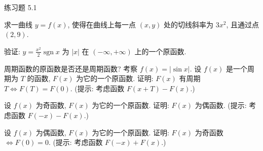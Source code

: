 \begin{exblock}{练习题 5.1}
  \item 求一曲线 $y=f(x)$, 使得在曲线上每一点 $(x,y)$ 处的切线斜率为 $3x^{2}$, 且通过点 $(2,9)$.

  \item 验证: $y=\frac{x^{2}}{2}\operatorname{sgn}x$ 为 $|x|$ 在 $(-\infty,+\infty)$ 上的一个原函数.

  \item 周期函数的原函数是否还是周期函数? 考察 $f(x)=|\sin x|$. 设 $f(x)$ 是一个周期为 $T$ 的函数, $F(x)$ 为它的一个原函数. 证明: $F(x)$ 有周期 $T\Longleftrightarrow F(T)=F(0)$. (提示: 考虑函数 $F(x+T)-F(x)$.)

  \item 设 $f(x)$ 为奇函数, $F(x)$ 为它的一个原函数. 证明: $F(x)$ 为偶函数. (提示: 考虑函数 $F(-x)-F(x)$.)

  \item 设 $f(x)$ 为偶函数, $F(x)$ 为它的一个原函数. 证明: $F(x)$ 为奇函数 $\Longleftrightarrow F(0)=0$. (提示: 考虑函数 $F(-x)+F(x)$.)
\end{exblock}
